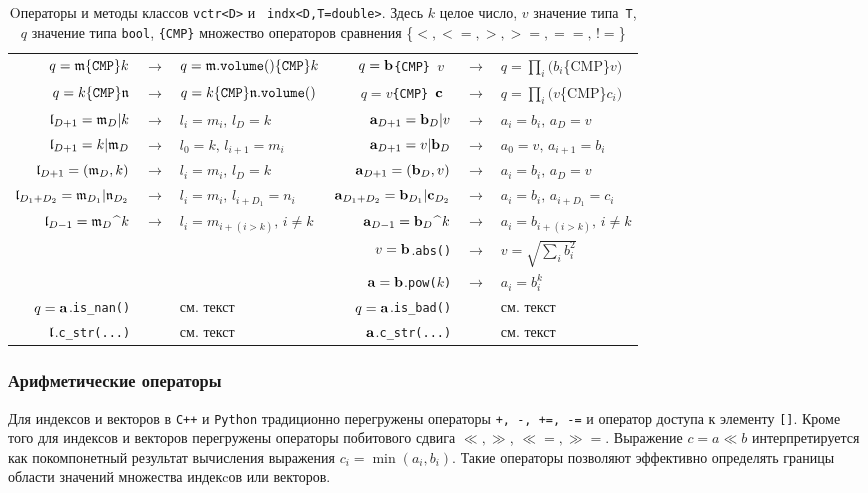 \begin{table}
\begin{center}
\begin{tabular}{|rcl|rcl|}
$ q = \mathfrak{m} {\tt \{CMP\}} k $ &$\to$& $q=\mathfrak{m}.{\tt volume}() {\tt \{CMP\}} k $ &
$ q = \mathbf{b}$\tt\{CMP\} $v$ &$\to$& $q = \prod_i (b_i$\{CMP\}$v)$  \\
$ q = k {\tt \{CMP\}} \mathfrak{n} $ &$\to$& $q= k{\tt \{CMP\}} \mathfrak{n}.{\tt volume}() $ &
$ q = v$\tt\{CMP\} $\mathbf{c}$ &$\to$& $q = \prod_i (v$\{CMP\}$c_i)$  \\
\hline
$ \mathfrak{l}_{D+1} = \mathfrak{m}_D|k$ &$\to$& $l_i = m_i,\, l_D=k$  &  $ \mathbf{a}_{D+1} = \mathbf{b}_D|v$ &$\to$& $a_i = b_i,\, a_D=v$ \\
$ \mathfrak{l}_{D+1} = k|\mathfrak{m}_D$ &$\to$& $l_0=k,\, l_{i+1}=m_i$  &  $ \mathbf{a}_{D+1} = v|\mathbf{b}_D$ &$\to$& $a_0 = v,\, a_{i+1}=b_i$ \\
$ \mathfrak{l}_{D+1} = (\mathfrak{m}_D,k)$ &$\to$& $l_i = m_i,\, l_D=k$  &  $ \mathbf{a}_{D+1} = (\mathbf{b}_D,v)$ &$\to$& $a_i = b_i,\, a_D=v$ \\
$ \mathfrak{l}_{D_1+D_2} = \mathfrak{m}_{D_1}|\mathfrak{n}_{D_2}$ &$\to$& $l_i = m_i,\, l_{i+D_1}=n_i$  &  
$ \mathbf{a}_{D_1+D_2} = \mathbf{b}_{D_1}|\mathbf{c}_{D_2}$ &$\to$& $a_i = b_i,\, a_{i+D_1}=c_i$ \\
$ \mathfrak{l}_{D-1} = \mathfrak{m}_D\,\,\widehat{}\,\,k$ &$\to$& $l_i = m_{i+(i>k)},\,i\neq k$  &  
$ \mathbf{a}_{D-1} = \mathbf{b}_D\,\,\widehat{}\,\,k$ &$\to$& $a_i = b_{i+(i>k)},\,i\neq k$  \\  
\hline
&&& $v=\mathbf{b}$.{\tt abs()} &$\to$& $v=\sqrt{\sum_i b_i^2}$\\
&&& $\mathbf{a}=\mathbf{b}$.{\tt pow($k$)} &$\to$& $a_i=b_i^k$\\
$q=\mathbf{a}$.{\tt is\_nan()} && см. текст & $q=\mathbf{a}$.{\tt is\_bad()} && см. текст \\
$\mathfrak{l}$.{\tt c\_str(...)} && см. текст & $\mathbf{a}$.{\tt c\_str(...)} && см. текст \\
\hline
\end{tabular}
\end{center}
\caption{Oператоры и методы классов {\tt vctr<D>} и {\tt
    indx<D,T=double>}. Здесь $k$ целое число, $v$ значение типа{\tt~T}, $q$
  значение типа {\tt bool}, {\tt \{CMP\}} множество операторов сравнения \{$<, <=, >, >=,
  ==, \,!\!=$\}}\label{vctr:op:table}
\end{table}

\subsubsection{Арифметические операторы}
Для индексов и векторов в {\tt C++} и {\tt Python} традиционно перегружены операторы {\tt +, -, +=, -=} и
оператор доступа к элементу {\tt []}. Кроме того для индексов и векторов перегружены операторы
побитового сдвига $\ll, \gg$, $\ll=, \gg=$. Выражение $c=a\ll b$ интерпретируется
как покомпонетный результат вычисления выражения $c_i=\min(a_i,b_i)$. Такие операторы
позволяют эффективно определять границы области значений множества индекcов
или векторов. 

